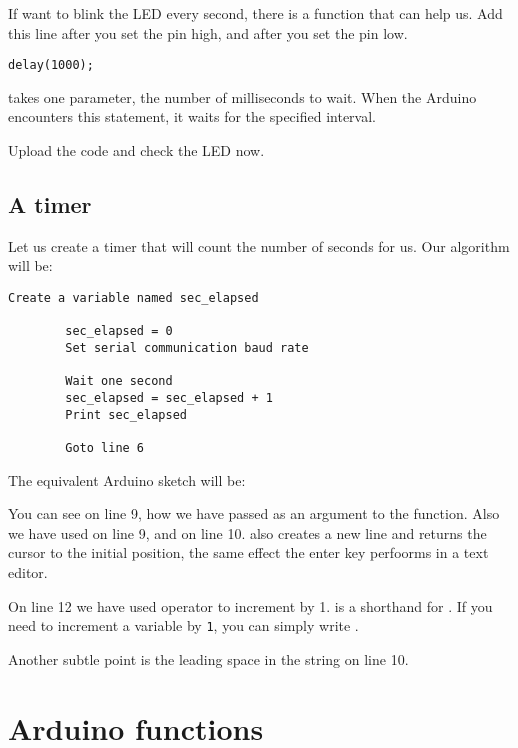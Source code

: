 \documentclass{article}
\begin{document}
		If want to blink the LED every second, there is a function  that can help us. Add this line after you set the pin high, and after you set the pin low.

		\begin{lstlisting}[gobble=8, numbers = none]
		delay(1000);
		\end{lstlisting}

		 takes one parameter, the number of milliseconds to wait. When the Arduino encounters this statement, it waits for the specified interval. 

		Upload the code and check the LED now.

	\subsection{A timer}

		Let us create a timer that will count the number of seconds for us. Our algorithm will be:

		\begin{lstlisting}[gobble=8]
		Create a variable named sec_elapsed

		sec_elapsed = 0
		Set serial communication baud rate

		Wait one second
		sec_elapsed = sec_elapsed + 1
		Print sec_elapsed

		Goto line 6
		\end{lstlisting}

		The equivalent Arduino sketch will be:

		

		You can see on line 9, how we have passed  as an argument to the  function. Also we have used  on line 9, and  on line 10.  also creates a new line and returns the cursor to the initial position, the same effect the enter key perfoorms in a text editor.

		On line 12 we have used \inlncd{+=} operator to increment  by 1.  is a shorthand for . If you need to increment a variable by \texttt{1}, you can simply write .

		Another subtle point is the leading space in the string on line 10.

\section{Arduino functions}
\end{document}
